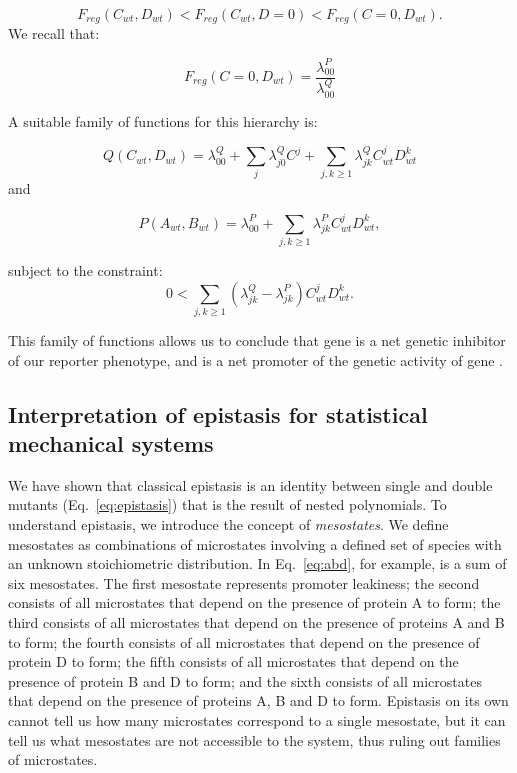 \begin{equation*}
    F_{reg}(C_{wt}, D_{wt}) < F_{reg}(C_{wt}, D=0) < F_{reg}(C=0, D_{wt}).
\end{equation*}
We recall that:

\begin{equation*}
    F_{reg}(C=0, D_{wt}) = \frac{\lambda_{00}^P}{\lambda^Q_{00}}
\end{equation*}

A suitable family of functions for this hierarchy is:

\begin{equation}
  Q(C_{wt}, D_{wt}) = \lambda^Q_{00} + \sum_j \lambda^Q_{j0}C^j +
                        \sum_{j,k\geq 1} \lambda^Q_{jk}C_{wt}^j D_{wt}^k
\end{equation}
and

\begin{equation}
  P(A_{wt}, B_{wt}) = \lambda^P_{00} +
                        \sum_{j,k \geq 1} \lambda^P_{jk}C_{wt}^j D_{wt}^k,
\end{equation}

subject to the constraint:
\begin{equation}
  0 < \sum_{j,k\geq 1} (\lambda^Q_{jk} - \lambda_{jk}^P)C_{wt}^j D_{wt}^k.
\end{equation}

This family of functions allows us to conclude that gene  is a net
genetic inhibitor of our reporter phenotype, and  is a net promoter of
the genetic activity of gene .

\subsection{Interpretation of epistasis for statistical mechanical systems}
We have shown that classical epistasis is an identity between single and double
mutants (Eq.~\ref{eq:epistasis}) that is the result of nested polynomials. To
understand epistasis, we introduce the concept of \emph{mesostates}. We define
mesostates as combinations of microstates involving a defined set of species
with an unknown stoichiometric distribution. In Eq.~\ref{eq:abd}, for example,
is a sum of six mesostates. The first mesostate represents promoter leakiness;
the second consists of all microstates that depend on the presence of protein A
to form; the third consists of all microstates that depend on the presence of
proteins A and B to form; the fourth consists of all microstates that depend on
the presence of protein D to form; the fifth consists of all microstates that
depend on the presence of protein B and D to form; and the sixth consists of all
microstates that depend on the presence of proteins A, B and D to form.
Epistasis on its own cannot tell us how many microstates correspond to a single
mesostate, but it can tell us what mesostates are not accessible to the system,
thus ruling out families of microstates.

